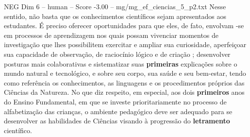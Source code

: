 \begin{textsample}{NEG Dim 6 – human – Score -3.00 – mg/mg\_ef\_ciencias\_5\_p2.txt}  \label{ex:f6_neg_004}
Nesse sentido, não basta que os conhecimentos científicos sejam apresentados aos estudantes. É preciso oferecer oportunidades para que eles, de fato, envolvam -se em processos de aprendizagem nos quais possam vivenciar momentos de investigação que lhes possibilitem exercitar e ampliar sua curiosidade, aperfeiçoar sua capacidade de observação, de raciocínio lógico e de criação ; desenvolver posturas mais colaborativas e sistematizar suas \textbf{primeiras} explicações sobre o mundo natural e tecnológico, e sobre seu corpo, sua saúde e seu bem-estar, tendo como referência os conhecimentos, as linguagens e os procedimentos próprios das Ciências da Natureza.
No que diz respeito, em especial, aos dois \textbf{primeiros} anos do Ensino Fundamental, em que se investe prioritariamente no processo de alfabetização das crianças, o ambiente pedagógico deve ser adequado para se desenvolver as habilidades de Ciências visando à progressão do \textbf{letramento} científico.

\end{textsample}
